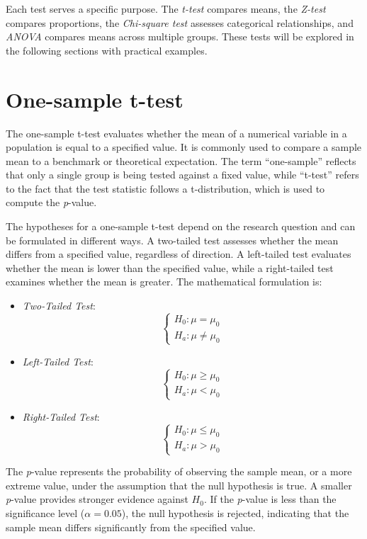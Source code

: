 \documentclass[
]{book}
\providecommand{\tightlist}{%
  \setlength{\itemsep}{0pt}\setlength{\parskip}{0pt}}
\theoremstyle{definition}
\theoremstyle{definition}
\theoremstyle{definition}
\theoremstyle{definition}
\theoremstyle{remark}
\begin{document}
Each test serves a specific purpose. The \emph{t-test} compares means, the \emph{Z-test} compares proportions, the \emph{Chi-square test} assesses categorical relationships, and \emph{ANOVA} compares means across multiple groups. These tests will be explored in the following sections with practical examples.

\section{One-sample t-test}\label{one-sample-t-test}

The one-sample t-test evaluates whether the mean of a numerical variable in a population is equal to a specified value. It is commonly used to compare a sample mean to a benchmark or theoretical expectation. The term ``one-sample'' reflects that only a single group is being tested against a fixed value, while ``t-test'' refers to the fact that the test statistic follows a t-distribution, which is used to compute the \emph{p}-value.

The hypotheses for a one-sample t-test depend on the research question and can be formulated in different ways. A two-tailed test assesses whether the mean differs from a specified value, regardless of direction. A left-tailed test evaluates whether the mean is lower than the specified value, while a right-tailed test examines whether the mean is greater. The mathematical formulation is:

\begin{itemize}
\tightlist
\item
  \emph{Two-Tailed Test}:
  \[
  \begin{cases}
  H_0:  \mu   =  \mu_0 \\
  H_a:  \mu \neq \mu_0
  \end{cases}
  \]
\item
  \emph{Left-Tailed Test}:
  \[
  \begin{cases}
  H_0:  \mu \geq \mu_0 \\
  H_a:  \mu  <   \mu_0
  \end{cases}
  \]
\item
  \emph{Right-Tailed Test}:
  \[
  \begin{cases}
  H_0:  \mu \leq \mu_0 \\
  H_a:  \mu >   \mu_0
  \end{cases}
  \]
\end{itemize}

The \emph{p}-value represents the probability of observing the sample mean, or a more extreme value, under the assumption that the null hypothesis is true. A smaller \emph{p}-value provides stronger evidence against \(H_0\). If the \emph{p}-value is less than the significance level (\(\alpha = 0.05\)), the null hypothesis is rejected, indicating that the sample mean differs significantly from the specified value.
\end{document}
